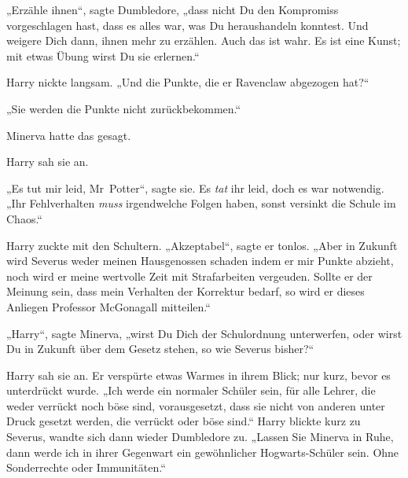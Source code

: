 „Erzähle ihnen“, sagte Dumbledore, „dass nicht Du den Kompromiss vorgeschlagen hast, dass es alles war, was Du heraushandeln konntest. Und weigere Dich dann, ihnen mehr zu erzählen. Auch das ist wahr. Es ist eine Kunst; mit etwas Übung wirst Du sie erlernen.“

Harry nickte langsam. „Und die Punkte, die er Ravenclaw abgezogen hat?“

„Sie werden die Punkte nicht zurückbekommen.“

Minerva hatte das gesagt.

Harry sah sie an.

„Es tut mir leid, Mr~Potter“, sagte sie. Es \emph{tat} ihr leid, doch es war notwendig. „Ihr Fehlverhalten \emph{muss} irgendwelche Folgen haben, sonst versinkt die Schule im Chaos.“

Harry zuckte mit den Schultern. „Akzeptabel“, sagte er tonlos. „Aber in Zukunft wird Severus weder meinen Hausgenossen schaden indem er mir Punkte abzieht, noch wird er meine wertvolle Zeit mit Strafarbeiten vergeuden. Sollte er der Meinung sein, dass mein Verhalten der Korrektur bedarf, so wird er dieses Anliegen Professor McGonagall mitteilen.“

„Harry“, sagte Minerva, „wirst Du Dich der Schulordnung unterwerfen, oder wirst Du in Zukunft über dem Gesetz stehen, so wie Severus bisher?“

Harry sah sie an. Er verspürte etwas Warmes in ihrem Blick; nur kurz, bevor es unterdrückt wurde. „Ich werde ein normaler Schüler sein, für alle Lehrer, die weder verrückt noch böse sind, vorausgesetzt, dass sie nicht von anderen unter Druck gesetzt werden, die verrückt oder böse sind.“ Harry blickte kurz zu Severus, wandte sich dann wieder Dumbledore zu. „Lassen Sie Minerva in Ruhe, dann werde ich in ihrer Gegenwart ein gewöhnlicher Hogwarts-Schüler sein. Ohne Sonderrechte oder Immunitäten.“

